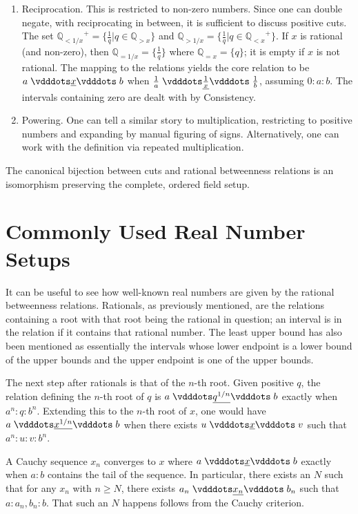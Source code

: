 \documentclass[12pt]{article}
\newcommand{\qcut}[2][x]{\ensuremath{\mathbb{Q}_{#2 #1}}}
\newcommand{\qlt}[1][x]{\qcut[#1]{<}}
\newcommand{\qeq}[1][x]{\qcut[#1]{=}}
\newcommand{\qgt}[1][x]{\qcut[#1]{>}}
\begin{document}
\begin{enumerate}
    \item Reciprocation. This is restricted to non-zero numbers. Since one can double negate, with reciprocating in between, it is sufficient to discuss positive cuts.  The set $\qlt[1/x]^+ = \{\frac{1}{q} | q \in \qgt\}$ and $\qgt[1/x] = \{ \frac{1}{q} | q \in \qlt^+ \}$. If $x$ is rational (and non-zero), then $\qeq[1/x] = \{\frac{1}{q}\}$ where $\qeq = \{q\}$; it is empty if $x$ is not rational. The mapping to the relations yields the core relation to be $a \xrel b$ when $\frac{1}{a} \xrel[\frac{1}{x}] \frac{1}{b}$, assuming $0:a:b$. The intervals containing zero are dealt with by Consistency. 
    \item Powering. One can tell a similar story to multiplication, restricting to positive numbers and expanding by manual figuring of signs. Alternatively, one can work with the definition via repeated multiplication. 
\end{enumerate}

The canonical bijection between cuts and rational betweenness relations is an isomorphism preserving the complete, ordered field setup. 

\section{Commonly Used Real Number Setups}

It can be useful to see how well-known real numbers are given by the rational betweenness relations. Rationals, as previously mentioned, are the relations containing a root with that root being the rational in question; an interval is in the relation if it contains that rational number. The least upper bound has also been mentioned as essentially the intervals whose lower endpoint is a lower bound of the upper bounds and the upper endpoint is one of the upper bounds. 

The next step after rationals is that of the $n$-th root. Given positive $q$, the relation defining the $n$-th root of $q$ is $a \xrel[q^{1/n}] b$ exactly when $a^n: q: b^n$. Extending this to the $n$-th root of $x$, one would have $a \xrel[x^{1/n}] b$ when there exists $u \xrel v$ such that $a^n:u:v:b^n$.

A Cauchy sequence $x_n$ converges to $x$ where $a \xrel b$ exactly when $a:b$ contains the tail of the sequence. In particular, there exists an $N$ such that for any $x_n$ with $n \geq N$, there exists $a_n \xrel[x_n] b_n$ such that $a:{a_n, b_n}:b$. That such an $N$ happens follows from the Cauchy criterion.  
\end{document}

